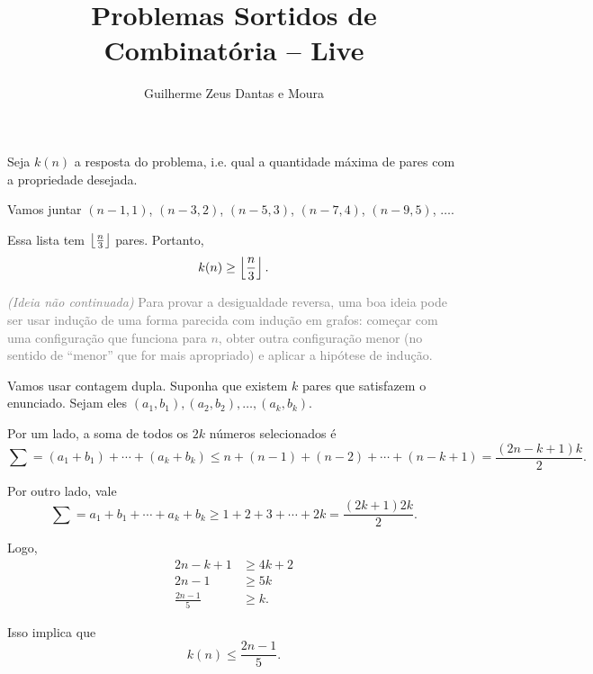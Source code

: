 \documentclass[11pt, a4paper]{article}
\title{Problemas Sortidos de Combinatória -- Live}
\author{Guilherme Zeus Dantas e Moura}
\begin{document}
	
	\zeustitle

	\setcounter{prob}{3}

	Seja $k(n)$ a resposta do problema, i.e. qual a quantidade máxima de pares com a propriedade desejada. 

	Vamos juntar $(n - 1, 1)$, $(n - 3, 2)$, $(n - 5, 3)$, $(n - 7, 4)$, $(n - 9, 5)$, $\dots$.

	Essa lista tem $\left \lfloor{\frac{n}{3}}\right \rfloor$ pares. Portanto, \[k(n) \ge \left \lfloor{\frac{n}{3}}\right \rfloor.\]

	\textcolor{gray}{\textsl{(Ideia não continuada)} Para provar a desigualdade reversa, uma boa ideia pode ser usar indução de uma forma parecida com indução em grafos: começar com uma configuração que funciona para $n$, obter outra configuração menor (no sentido de ``menor'' que for mais apropriado) e aplicar a hipótese de indução.}

	\vspace{1em}

	Vamos usar contagem dupla. Suponha que existem $k$ pares que satisfazem o enunciado. Sejam eles $(a_1, b_1), (a_2, b_2), \dots, (a_k, b_k)$.

	Por um lado, a soma de todos os $2k$ números selecionados é \[\sum = (a_1 + b_1) + \cdots + (a_k + b_k)\le n + (n - 1) + (n - 2) + \cdots + (n - k + 1) = \frac{(2n - k + 1)k}{2}.\]

	Por outro lado, vale \[\sum = a_1 + b_1 + \cdots + a_k + b_k \ge 1 + 2 + 3 + \cdots + 2k = \frac{(2k+1)2k}{2}.\]

	Logo,
	\begin{align*}
		2n - k + 1 & \ge 4k + 2\\
		2n - 1 & \ge 5k\\
		\frac{2n - 1}{5} & \ge k.
	\end{align*}

	Isso implica que \[ k(n) \le \frac{2n-1}{5}.\]

	\vspace{1em}
\end{document}
